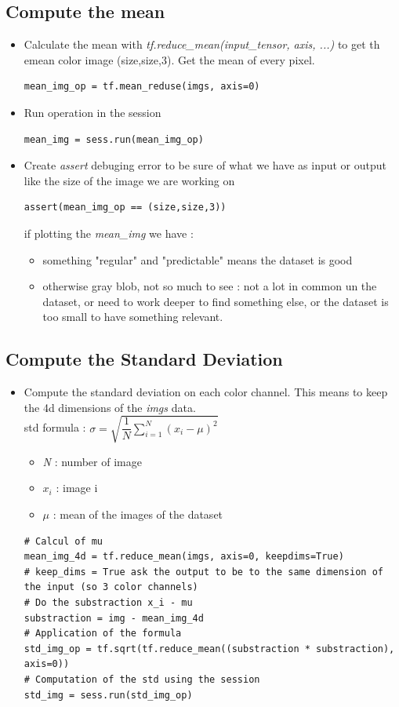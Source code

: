\documentclass[12pt,a4paper]{article}
\begin{document}
\subsection{Compute the mean}
\begin{itemize}
\item Calculate the mean with \textit{tf.reduce\_mean(input\_tensor, axis, ...)} to get th emean color image (size,size,3). Get the mean of every pixel.
\begin{lstlisting}
mean_img_op = tf.mean_reduse(imgs, axis=0)
\end{lstlisting}
\item Run operation in the session
\begin{lstlisting}
mean_img = sess.run(mean_img_op)
\end{lstlisting}
\item Create \textit{assert} debuging error to be sure of what we have as input or output like the size of the image we are working on
\begin{lstlisting}
assert(mean_img_op == (size,size,3))
\end{lstlisting}
if plotting the \textit{mean\_img} we have :
\begin{itemize}
\item something "regular" and "predictable" means the dataset is good
\item otherwise gray blob, not so much to see : not a lot in common un the dataset, or need to work deeper to find something else, or the dataset is too small to have something relevant.
\end{itemize}
\end{itemize}
\subsection{Compute the Standard Deviation}
\begin{itemize}
\item Compute the standard deviation on each color channel. This means to keep the 4d dimensions of the \textit{imgs} data.\\
std formula : $\sigma = \sqrt{\dfrac{1}{N}\sum_{i=1}^{N} (x_i - \mu)^2}$
\begin{itemize}
\item \textit{N} : number of image
\item $x_i$ : image i
\item $\mu$ : mean of the images of the dataset
\end{itemize}
\begin{lstlisting}
# Calcul of mu
mean_img_4d = tf.reduce_mean(imgs, axis=0, keepdims=True)
# keep_dims = True ask the output to be to the same dimension of the input (so 3 color channels)
# Do the substraction x_i - mu
substraction = img - mean_img_4d
# Application of the formula
std_img_op = tf.sqrt(tf.reduce_mean((substraction * substraction), axis=0))
# Computation of the std using the session
std_img = sess.run(std_img_op)
\end{lstlisting}
\end{itemize}
\end{document}
